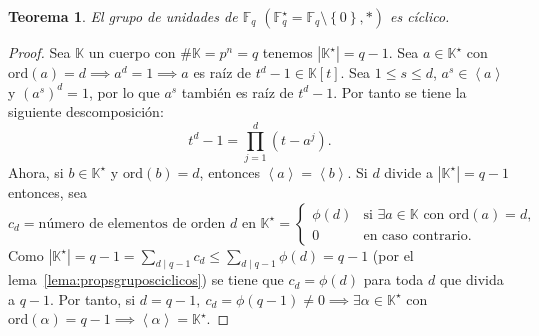 \documentclass[10pt, spanish]{report}
\newtheorem{tma}{Teorema}[chapter]
\theoremstyle{definition}
\newcommand{\F}{\mathbb{F}}
\newcommand{\K}{\mathbb{K}}
\newcommand{\ord}[1]{\text{ord}(#1)}
\renewcommand{\leq}{\leqslant}
\begin{document}
\begin{tma}\label{tma:grupounidadesciclico}
    El grupo de unidades de $\F_q$ $\left( \F_q^\star=\F_q\setminus\left\{ 0
    \right\},*\right)$ es cíclico.
\end{tma}

\begin{proof}
    Sea $\K$ un cuerpo con $\#\K=p^n=q$ tenemos $\left|\K^\star\right|=q-1$. Sea
    $a\in\K^\star$ con $\ord{a}=d \implies a^d=1 \implies a$ es raíz de
    $t^d-1\in\K[t]$. Sea $1\leq s\leq d$, $a^s\in\left<a\right>$ y $(a^s)^d=1$,
    por lo que $a^s$ también es raíz de $t^d-1$. Por tanto se tiene la siguiente
    descomposición: \[t^d-1=\prod_{j=1}^{d}(t-a^j).\]
    Ahora, si $b\in\K^\star$ y $\ord{b}=d$, entonces $\left<a\right> = \left<b
    \right>$. Si $d$ divide a $\left| \K^\star \right| = q-1$ entonces, sea
    \[c_d=\text{número de elementos de orden }d\text{ en }\K^\star=
        \begin{cases}
            \phi(d)&\text{si }\exists a\in\K \text{ con }\ord{a}=d,\\
            0&\text{en caso contrario}.
        \end{cases}\]
        Como $\left|\K^\star\right|=q-1=\sum_{d\mid q-1} c_d\leq \sum_{d\mid
        q-1}\phi(d)=q-1$ (por el lema~\ref{lema:propsgruposciclicos}) se tiene
        que $c_d=\phi(d)$ para toda $d$ que divida a $q-1$. Por tanto, si
        $d=q-1,\ c_d=\phi(q-1)\neq0 \implies\exists\alpha\in\K^\star$ con
        $\ord{\alpha}=q-1\implies \left<\alpha\right>=\K^\star$.
\end{proof}
\end{document}
